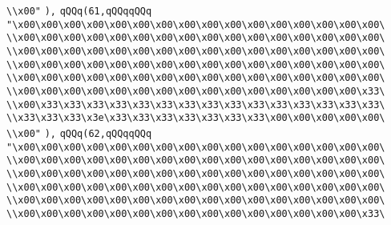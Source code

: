 \verb|\\x00"|\newline
\verb|),|\newline
\verb|qQQq(61,qQQqqQQq|\newline
\verb|"\x00\x00\x00\x00\x00\x00\x00\x00\x00\x00\x00\x00\x00\x00\x00\x00\|\newline
\verb|\\x00\x00\x00\x00\x00\x00\x00\x00\x00\x00\x00\x00\x00\x00\x00\x00\|\newline
\verb|\\x00\x00\x00\x00\x00\x00\x00\x00\x00\x00\x00\x00\x00\x00\x00\x00\|\newline
\verb|\\x00\x00\x00\x00\x00\x00\x00\x00\x00\x00\x00\x00\x00\x00\x00\x00\|\newline
\verb|\\x00\x00\x00\x00\x00\x00\x00\x00\x00\x00\x00\x00\x00\x00\x00\x00\|\newline
\verb|\\x00\x00\x00\x00\x00\x00\x00\x00\x00\x00\x00\x00\x00\x00\x00\x33\|\newline
\verb|\\x00\x33\x33\x33\x33\x33\x33\x33\x33\x33\x33\x33\x33\x33\x33\x33\|\newline
\verb|\\x33\x33\x33\x3e\x33\x33\x33\x33\x33\x33\x33\x00\x00\x00\x00\x00\|\newline
\verb|\\x00"|\newline
\verb|),|\newline
\verb|qQQq(62,qQQqqQQq|\newline
\verb|"\x00\x00\x00\x00\x00\x00\x00\x00\x00\x00\x00\x00\x00\x00\x00\x00\|\newline
\verb|\\x00\x00\x00\x00\x00\x00\x00\x00\x00\x00\x00\x00\x00\x00\x00\x00\|\newline
\verb|\\x00\x00\x00\x00\x00\x00\x00\x00\x00\x00\x00\x00\x00\x00\x00\x00\|\newline
\verb|\\x00\x00\x00\x00\x00\x00\x00\x00\x00\x00\x00\x00\x00\x00\x00\x00\|\newline
\verb|\\x00\x00\x00\x00\x00\x00\x00\x00\x00\x00\x00\x00\x00\x00\x00\x00\|\newline
\verb|\\x00\x00\x00\x00\x00\x00\x00\x00\x00\x00\x00\x00\x00\x00\x00\x33\|\newline
